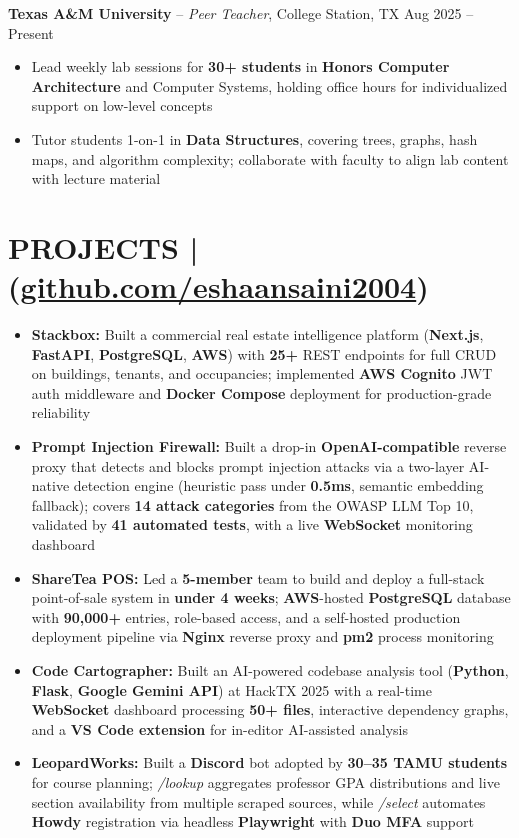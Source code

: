 \documentclass[10pt, letterpaper]{article}
\begin{document}
\textbf{Texas A\&M University} -- \textit{Peer Teacher}, College Station, TX \hfill Aug 2025 -- Present
\begin{itemize}
  \item Lead weekly lab sessions for \textbf{30+ students} in \textbf{Honors Computer Architecture} and Computer Systems, holding office hours for individualized support on low-level concepts
  \item Tutor students 1-on-1 in \textbf{Data Structures}, covering trees, graphs, hash maps, and algorithm complexity; collaborate with faculty to align lab content with lecture material
\end{itemize}

\section{PROJECTS | \small\normalfont(\href{https://github.com/eshaansaini2004}{github.com/eshaansaini2004})}
\begin{itemize}
  \item \textbf{Stackbox:} Built a commercial real estate intelligence platform (\textbf{Next.js}, \textbf{FastAPI}, \textbf{PostgreSQL}, \textbf{AWS}) with \textbf{25+} REST endpoints for full CRUD on buildings, tenants, and occupancies; implemented \textbf{AWS Cognito} JWT auth middleware and \textbf{Docker Compose} deployment for production-grade reliability
  \item \textbf{Prompt Injection Firewall:} Built a drop-in \textbf{OpenAI-compatible} reverse proxy that detects and blocks prompt injection attacks via a two-layer AI-native detection engine (heuristic pass under \textbf{0.5ms}, semantic embedding fallback); covers \textbf{14 attack categories} from the OWASP LLM Top 10, validated by \textbf{41 automated tests}, with a live \textbf{WebSocket} monitoring dashboard
  \item \textbf{ShareTea POS:} Led a \textbf{5-member} team to build and deploy a full-stack point-of-sale system in \textbf{under 4 weeks}; \textbf{AWS}-hosted \textbf{PostgreSQL} database with \textbf{90,000+} entries, role-based access, and a self-hosted production deployment pipeline via \textbf{Nginx} reverse proxy and \textbf{pm2} process monitoring
  \item \textbf{Code Cartographer:} Built an AI-powered codebase analysis tool (\textbf{Python}, \textbf{Flask}, \textbf{Google Gemini API}) at HackTX 2025 with a real-time \textbf{WebSocket} dashboard processing \textbf{50+ files}, interactive dependency graphs, and a \textbf{VS Code extension} for in-editor AI-assisted analysis
  \item \textbf{LeopardWorks:} Built a \textbf{Discord} bot adopted by \textbf{30--35 TAMU students} for course planning; \textit{/lookup} aggregates professor GPA distributions and live section availability from multiple scraped sources, while \textit{/select} automates \textbf{Howdy} registration via headless \textbf{Playwright} with \textbf{Duo MFA} support
\end{itemize}
\end{document}

